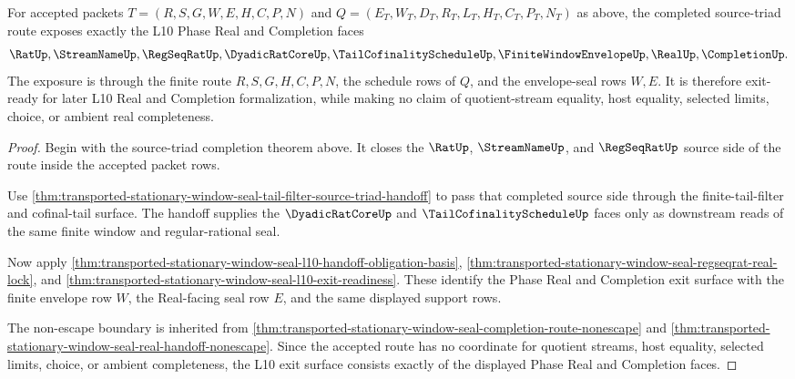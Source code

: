\begin{theorem}
\label{thm:transported-stationary-window-seal-l10-exit-source-triad-readiness}
For accepted packets $T=(R,S,G,W,E,H,C,P,N)$ and $Q=(E_T,W_T,D_T,R_T,L_T,H_T,C_T,P_T,N_T)$ as above, the completed source-triad route exposes exactly the L10 Phase Real and Completion faces
$$
\begin{aligned}
  \RatUp,\StreamNameUp,\RegSeqRatUp,
  \DyadicRatCoreUp,\TailCofinalityScheduleUp,
  \FiniteWindowEnvelopeUp,\RealUp,\CompletionUp .
\end{aligned}
$$
The exposure is through the finite route $R,S,G,H,C,P,N$, the schedule rows of $Q$, and the envelope-seal rows $W,E$. It is therefore exit-ready for later L10 Real and Completion formalization, while making no claim of quotient-stream equality, host equality, selected limits, choice, or ambient real completeness.
\end{theorem}
\begin{proof}
Begin with the source-triad completion theorem above. It closes the $\RatUp$, $\StreamNameUp$, and $\RegSeqRatUp$ source side of the route inside the accepted packet rows.

Use \autoref{thm:transported-stationary-window-seal-tail-filter-source-triad-handoff} to pass that completed source side through the finite-tail-filter and cofinal-tail surface. The handoff supplies the $\DyadicRatCoreUp$ and $\TailCofinalityScheduleUp$ faces only as downstream reads of the same finite window and regular-rational seal.

Now apply \autoref{thm:transported-stationary-window-seal-l10-handoff-obligation-basis}, \autoref{thm:transported-stationary-window-seal-regseqrat-real-lock}, and \autoref{thm:transported-stationary-window-seal-l10-exit-readiness}. These identify the Phase Real and Completion exit surface with the finite envelope row $W$, the Real-facing seal row $E$, and the same displayed support rows.

The non-escape boundary is inherited from \autoref{thm:transported-stationary-window-seal-completion-route-nonescape} and \autoref{thm:transported-stationary-window-seal-real-handoff-nonescape}. Since the accepted route has no coordinate for quotient streams, host equality, selected limits, choice, or ambient completeness, the L10 exit surface consists exactly of the displayed Phase Real and Completion faces.
\end{proof}
